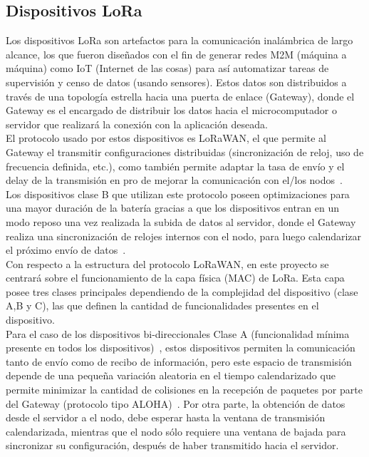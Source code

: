 \begin{justify}
\subsection{Dispositivos LoRa}
Los dispositivos LoRa son artefactos para la comunicación inalámbrica de largo alcance, los que fueron diseñados con el fin de generar redes M2M (máquina a máquina) como IoT (Internet de las cosas) para así automatizar tareas de supervisión y censo de datos (usando sensores). Estos datos son distribuidos a través de una topología estrella hacia una puerta de enlace (Gateway), donde el Gateway es el encargado de distribuir los datos hacia el microcomputador o servidor que realizará la conexión con la aplicación deseada.\\
El protocolo usado por estos dispositivos es LoRaWAN, el que permite al Gateway el transmitir configuraciones distribuidas (sincronización de reloj, uso de frecuencia definida, etc.), como también permite adaptar la tasa de envío y el delay de  la transmisión en pro de mejorar la comunicación con el/los nodos~\cite{Sornin}.\\
Los dispositivos clase B que utilizan este protocolo poseen optimizaciones para una mayor duración de la batería gracias a que los dispositivos entran en un modo reposo una vez realizada la subida de datos al servidor, donde el Gateway realiza una sincronización de relojes internos con el nodo, para luego calendarizar el próximo envío de datos~\cite{Sornin}.\\
Con respecto a la estructura del protocolo LoRaWAN, en este proyecto se centrará sobre el funcionamiento de la capa física (MAC) de LoRa. Esta capa posee tres clases principales dependiendo de la complejidad del dispositivo (clase A,B y C), las que definen la cantidad de funcionalidades presentes en el dispositivo.\\
Para el caso de los dispositivos bi-direccionales Clase A (funcionalidad mínima presente en todos los dispositivos)~\cite{Sornin2}, estos dispositivos permiten la comunicación tanto de envío como de recibo de información, pero este espacio de transmisión depende de una pequeña variación aleatoria en el tiempo calendarizado que permite minimizar la cantidad de colisiones en la recepción de paquetes por parte del Gateway (protocolo tipo ALOHA)~\cite{Sornin}. Por otra parte, la obtención de datos desde el servidor a el nodo, debe esperar hasta la ventana de transmisión calendarizada, mientras que el nodo sólo requiere una ventana de bajada para sincronizar su configuración, después de haber transmitido hacia el servidor.\\

\end{justify}
